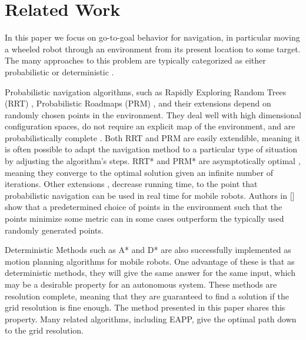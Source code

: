 \documentclass[journal]{IEEEtran}
\begin{document}
\section{Related Work}

In this paper we focus on go-to-goal behavior for navigation, in particular moving a wheeled robot through an environment from its present location to some target. 
The many approaches to this problem are typically categorized as either probabilistic or deterministic \cite{lavalle2006planning}. 

Probabilistic navigation algorithms, such as Rapidly Exploring Random Trees (RRT) \cite{lavalle1998rapidly}, Probabilistic Roadmaps (PRM) \cite{hsu1998finding}, and their extensions depend on randomly chosen points in the environment. 
They deal well with high dimensional configuration spaces, do not require an explicit map of the environment, and are probabilistically complete \cite{lavalle2006planning}. 
Both RRT and PRM are easily extendible, meaning it is often possible to adapt the navigation method to a particular type of situation by adjusting the algorithm's steps.
RRT* and PRM* are asymptotically optimal \cite{karaman2011sampling}, meaning they converge to the optimal solution given an infinite number of iterations.
Other extensions \cite{double trees}, \cite{heuristic bias} decrease running time, to the point that probabilistic navigation can be used in real time for mobile robots. 
Authors in [] show that a predetermined choice of points in the environment such that the points minimize some metric can in some cases outperform the typically used randomly generated points. 

Deterministic Methods such as A* \cite{hart1968formal} and D* \cite{koenig2005fast} are also successfully implemented as motion planning algorithms for mobile robots. 
One advantage of these is that as deterministic methods, they will give the same answer for the same input, which may be a desirable property for an autonomous system.
These methods are resolution complete, meaning that they are guaranteed to find a solution if the grid resolution is fine enough. 
The method presented in this paper shares this property. 
Many related algorithms, including EAPP, give the optimal path down to the grid resolution.
\end{document}

